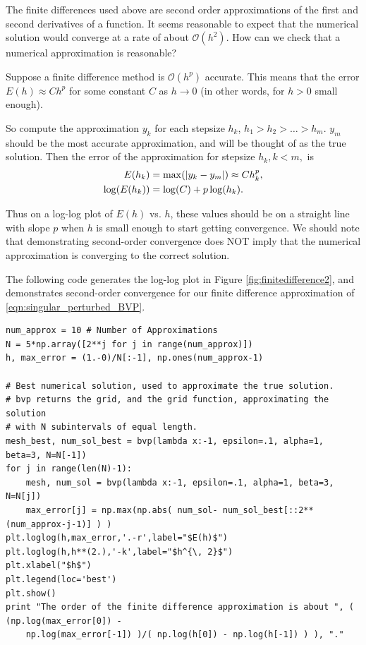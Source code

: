 The finite differences used above are second order approximations of the first and second derivatives of a function.  It seems reasonable to expect that the numerical solution would converge at a rate of about $\mathcal{O}(h^2)$. How can we check that a numerical approximation is reasonable?

Suppose a finite difference method is $\mathcal{O}(h^p)$ accurate.
This means that the error $E(h) \approx Ch^p$ for some constant $C$ as $h \to 0$ (in other words, for $h>0$ small enough).
 
So compute the approximation $y_k$ for each stepsize $h_k$, $h_1 > h_2> \ldots>h_m$.
$y_m$ should be the most accurate approximation, and will be thought of as the true solution. 
Then the error of the approximation for 
stepsize $h_k, k < m,$ is 
\begin{align*}
	E(h_k) &= \max( \left\lvert y_k - y_m\right\rvert) \approx C h_k^p ,\\
	\log(E(h_k)) &= \log(C) + p \log(h_k).
\end{align*}

Thus on a log-log plot of $E(h)$ vs. $h$, these values should be on a straight line with slope $p$ when $h$ is small enough to start getting convergence. We should note that demonstrating second-order convergence does NOT imply that the numerical approximation is converging to the correct solution. 

The following code generates the log-log plot in Figure \ref{fig:finitedifference2}, and demonstrates second-order convergence for our finite difference approximation of \eqref{eqn:singular_perturbed_BVP}.

\begin{lstlisting}
num_approx = 10 # Number of Approximations
N = 5*np.array([2**j for j in range(num_approx)])
h, max_error = (1.-0)/N[:-1], np.ones(num_approx-1)

# Best numerical solution, used to approximate the true solution.
# bvp returns the grid, and the grid function, approximating the solution
# with N subintervals of equal length.
mesh_best, num_sol_best = bvp(lambda x:-1, epsilon=.1, alpha=1, beta=3, N=N[-1])
for j in range(len(N)-1):
    mesh, num_sol = bvp(lambda x:-1, epsilon=.1, alpha=1, beta=3, N=N[j])
    max_error[j] = np.max(np.abs( num_sol- num_sol_best[::2**(num_approx-j-1)] ) )
plt.loglog(h,max_error,'.-r',label="$E(h)$")
plt.loglog(h,h**(2.),'-k',label="$h^{\, 2}$")
plt.xlabel("$h$")
plt.legend(loc='best')
plt.show()
print "The order of the finite difference approximation is about ", ( (np.log(max_error[0]) -
    np.log(max_error[-1]) )/( np.log(h[0]) - np.log(h[-1]) ) ), "."
\end{lstlisting}







